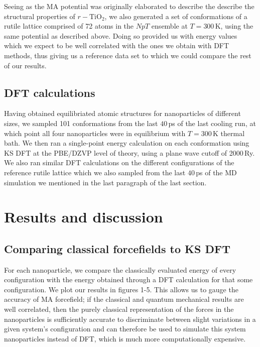 \documentclass[aps,prb,twocolumn,amsmath,amssymb,superscriptaddress,longbibliography]{revtex4-1}
\newcommand\tab[1][1cm]{\hspace*{#1}} %
\begin{document}
\tab Seeing as the MA potential was originally elaborated to describe the describe the structural properties of $r-\text{TiO}_2$, we also generated a set of conformations of a rutile lattice comprised of 72 atoms in the $NpT$ ensemble at $T = 300\,\text{K}$, using the same potential as described above.
Doing so provided us with energy values which we expect to be well correlated with the ones we obtain with DFT methods, thus giving us a reference data set to which we could compare the rest of our results.

\subsection{DFT calculations}

\tab Having obtained equilibriated atomic structures for nanoparticles of different sizes, we sampled 101 conformations from the last $40\,$ps of the last cooling run, at which point all four nanoparticles were in equilibrium with $T = 300\,\text{K}$ thermal bath.
We then ran a single-point energy calculation on each conformation using KS DFT at the PBE/DZVP level of theory, using a plane wave cutoff of 2000$\,$Ry.
We also ran similar DFT calculations on the different configurations of the reference rutile lattice which we also sampled from the last $40\,$ps of the MD simulation we mentioned in the last paragraph of the last section.


\section*{Results and discussion}

\subsection{Comparing classical forcefields to KS DFT}

\tab For each nanoparticle, we compare the classically evaluated energy of every configuration with the energy obtained through a DFT calculation for that some configuration. 
We plot our results in figures 1-5.
This allows us to gauge the accuracy of MA forcefield; if the classical and quantum mechanical results are well correlated, then the purely classical representation of the forces in the nanoparticles is sufficiently accurate to discriminate between slight variations in a given system's configuration and can therefore be used to simulate this system nanoparticles instead of DFT, which is much more computationally expensive.
\end{document}
